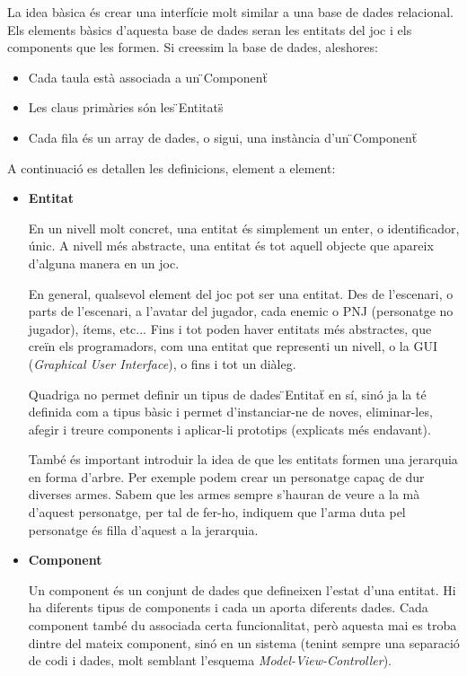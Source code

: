   La idea bàsica és crear una interfície molt similar a una base de dades relacional. Els elements bàsics d'aquesta base de dades seran les entitats del joc i els components que les formen. Si creessim la base de dades, aleshores:

  \begin{itemize}
    \item Cada taula està associada a un \"{}Component\"{}
    \item Les claus primàries són les \"{}Entitats\"{}
    \item Cada fila és un array de dades, o sigui, una instància d'un \"{}Component\"{}
  \end{itemize}

  A continuació es detallen les definicions, element a element:
  
  \begin{itemize}
    \item{\bf Entitat}

      En un nivell molt concret, una entitat és simplement un enter, o identificador, únic. A nivell més abstracte, una entitat és tot aquell objecte que apareix d'alguna manera en un joc.
      
      En general, qualsevol element del joc pot ser una entitat. Des de l'escenari, o parts de l'escenari, a l'avatar del jugador, cada enemic o PNJ (personatge no jugador), ítems, etc... Fins i tot poden haver entitats més abstractes, que creïn els programadors, com una entitat que representi un nivell, o la GUI ({\em Graphical User Interface}), o fins i tot un diàleg.

      Quadriga no permet definir un tipus de dades \"{}Entitat\"{} en sí, sinó ja la té definida com a tipus bàsic i permet d'instanciar-ne de noves, eliminar-les, afegir i treure components i aplicar-li prototips (explicats més endavant).
      
      També és important introduir la idea de que les entitats formen una jerarquia en forma d'arbre. Per exemple podem crear un personatge capaç de dur diverses armes. Sabem que les armes sempre s'hauran de veure a la mà d'aquest personatge, per tal de fer-ho, indiquem que l'arma duta pel personatge és filla d'aquest a la jerarquia.
      
      
    \item{\bf Component}

      Un component és un conjunt de dades que defineixen l'estat d'una entitat. Hi ha diferents tipus de components i cada un aporta diferents dades. Cada component també du associada certa funcionalitat, però aquesta mai es troba dintre del mateix component, sinó en un sistema (tenint sempre una separació de codi i dades, molt semblant l'esquema {\em Model-View-Controller}).
      

\end{itemize}

